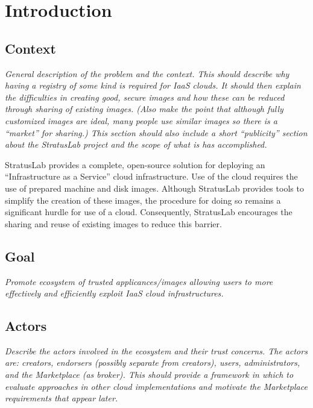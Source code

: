 \section{Introduction}
\label{sec:Introduction}

\subsection{Context}

{\em General description of the problem and the context.  This should
  describe why having a registry of some kind is required for IaaS
  clouds.  It should then explain the difficulties in creating good,
  secure images and how these can be reduced through sharing of
  existing images.  (Also make the point that although fully
  customized images are ideal, many people use similar images so there
  is a ``market'' for sharing.)  This section should also include a
  short ``publicity'' section about the StratusLab project and the
  scope of what is has accomplished.}

StratusLab provides a complete, open-source solution for deploying an
``Infrastructure as a Service'' cloud infrastructure.  Use of the
cloud requires the use of prepared machine and disk images.  Although
StratusLab provides tools to simplify the creation of these images,
the procedure for doing so remains a significant hurdle for use of a
cloud.  Consequently, StratusLab encourages the sharing and reuse of
existing images to reduce this barrier.

\subsection{Goal}

{\em Promote ecosystem of trusted applicances/images allowing users to
  more effectively and efficiently exploit IaaS cloud
  infrastructures.}

\subsection{Actors}

{\em Describe the actors involved in the ecosystem and their trust
  concerns.  The actors are: creators, endorsers (possibly separate
  from creators), users, administrators, and the Marketplace (as
  broker).  This should provide a framework in which to evaluate
  approaches in other cloud implementations and motivate the
  Marketplace requirements that appear later.}

